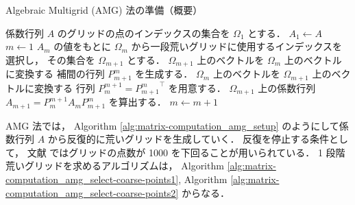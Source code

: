 \begin{algorithm}[tp]
    \caption{Algebraic Multigrid (AMG) 法の準備（概要） \cite{Ruge1987,Wolters2002}}
    \label{alg:matrix-computation_amg_setup}
    \begin{algorithmic}[1]
        \State 係数行列 $A$ のグリッドの点のインデックスの集合を $\Omega_1$ とする．
        \State $A_1 \gets A$
        \State $m \gets 1$
        \Loop
        \State $A_m$ の値をもとに $\Omega_m$ から一段荒いグリッドに使用するインデックスを選択し，
        その集合を $\Omega_{m+1}$ とする．
        \State $\Omega_{m+1}$ 上のベクトルを $\Omega_{m}$ 上のベクトルに変換する
        補間の行列 $P_{m+1}^{m}$ を生成する．
        \State $\Omega_{m}$ 上のベクトルを $\Omega_{m+1}$ 上のベクトルに変換する
        行列 $P_{m}^{m+1} = {P_{m+1}^{m}}^\top$ を用意する．
        \State $\Omega_{m+1}$ 上の係数行列 $A_{m+1} = P_{m}^{m+1} A_{m} P_{m+1}^{m}$ を算出する．
        \State \Return
        \EndIf
        \State $m \gets m + 1$
        \EndLoop
        \EndProcedure
    \end{algorithmic}
\end{algorithm}

AMG 法では，
Algorithm \ref{alg:matrix-computation_amg_setup}
のようにして係数行列 $A$ から反復的に荒いグリッドを生成していく．
反復を停止する条件として，
文献 \cite{Wolters2002} ではグリッドの点数が 1000 を下回ることが用いられている．
1 段階荒いグリッドを求めるアルゴリズムは，
Algorithm \ref{alg:matrix-computation_amg_select-coarse-points1},
Algorithm \ref{alg:matrix-computation_amg_select-coarse-points2}
からなる．

